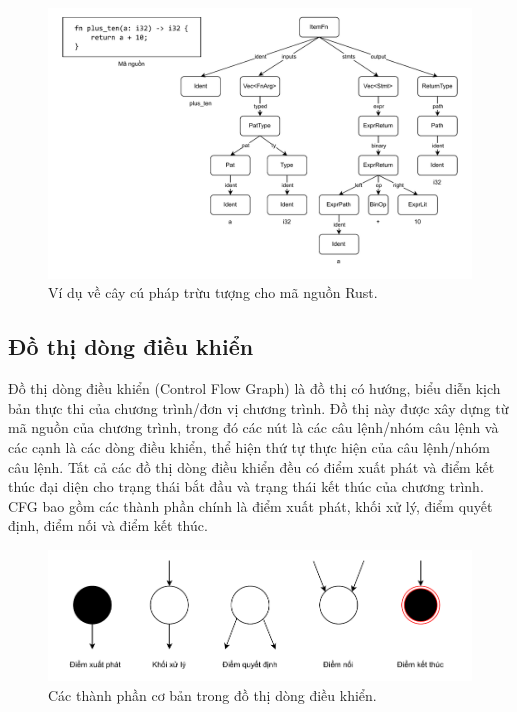\begin{figure}[H]
  \includegraphics[width=1\columnwidth]{figures/c2/c2_ast.drawio.pdf}
  \centering
  \caption{Ví dụ về cây cú pháp trừu tượng cho mã nguồn Rust.}
  \label{img:c2_ast}
\end{figure}

\subsection{Đồ thị dòng điều khiển}

Đồ thị dòng điều khiển (Control Flow Graph) \cite{yan2019classifying} là đồ thị có hướng, biểu diễn kịch bản thực thi của chương trình/đơn vị chương trình.
Đồ thị này được xây dựng từ mã nguồn của chương trình, trong đó các nút là các câu lệnh/nhóm câu lệnh và các cạnh là các dòng điều khiển, thể hiện thứ tự thực hiện của câu lệnh/nhóm câu lệnh.
Tất cả các đồ thị dòng điều khiển đều có điểm xuất phát và điểm kết thúc đại diện cho trạng thái bắt đầu và trạng thái kết thúc của chương trình.
CFG bao gồm các thành phần chính là điểm xuất phát, khối xử lý, điểm quyết định, điểm nối và điểm kết thúc.

\begin{figure}[H]
  \includegraphics[width=1\columnwidth]{figures/c2/c2_cfg_point.drawio.pdf}
  \centering
  \caption{Các thành phần cơ bản trong đồ thị dòng điều khiển.}
  \label{img:c2_cfg_point}
\end{figure}

